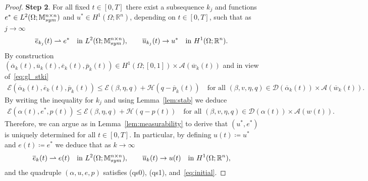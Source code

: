 \documentclass[reqno]{amsart}
\theoremstyle{definition}
\numberwithin{equation}{section}
\def\R {\mathbb R}
\def\M {\mathbb M^{n\times n}_{\rm sym}}
\begin{document}
\begin{proof}
{\bf Step 2}. For all fixed $t\in[0,T]$ there exist a subsequence $k_j$ and functions $e^*\in L^2(\Omega;\M)$ and $u^*\in H^1(\Omega;\R^n)$, depending on $t\in[0,T]$, such that as $j\to\infty$
$$\overline e_{k_j}(t)\rightharpoonup e^*\quad\text{in $L^2(\Omega;\M)$},\qquad \overline u_{k_j}(t)\to u^*\quad\text{in $H^1(\Omega;\R^n)$}.$$
By construction $(\overline \alpha_k(t),\overline u_k(t),\overline e_k(t),\overline p_k(t))\in H^1(\Omega;[0,1])\times \mathcal A(\overline w_k(t))$ and in view of~\eqref{eq:gl_stki}
\begin{align*}
\mathcal E(\overline\alpha_k(t),\overline e_k(t),\overline p_k(t))\le \mathcal E(\beta,\eta,q)+\mathcal H(q-\overline p_k(t))\quad\text{for all $(\beta,v,\eta,q)\in \mathcal D(\overline \alpha_k(t))\times \mathcal A(\overline w_k(t))$}.
\end{align*}
By writing the inequality for $k_j$ and using Lemma~\ref{lem:stab} we deduce
\begin{align*}
\mathcal E(\alpha(t),e^*,p(t))\le \mathcal E(\beta,\eta,q)+\mathcal H(q-p(t))\quad\text{for all $(\beta,v,\eta,q)\in \mathcal D(\alpha(t))\times \mathcal A(w(t))$}.
\end{align*}
Therefore, we can argue as in Lemma~\ref{lem:measurability} to derive that $(u^*,e^*)$ is uniquely determined for all $t\in[0,T]$. In particular, by defining $u(t)\coloneqq u^*$ and $e(t)\coloneqq e^*$ we deduce that as $k\to\infty$
$$\overline e_k(t)\rightharpoonup e(t)\quad\text{in $L^2(\Omega;\M)$},\qquad \overline u_k(t)\to u(t)\quad\text{in $H^1(\Omega;\R^n)$},$$
and the quadruple $(\alpha,u,e,p)$ satisfies (qs0), (qs1), and~\eqref{eq:initial}.


\end{proof}
\end{document}
